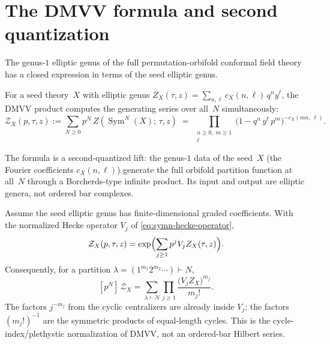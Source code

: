 
\section{The DMVV formula and second quantization}\label{sec:symn-dmvv}

The genus-$1$ elliptic genus of the full permutation-orbifold
conformal field theory has a closed expression in terms of the seed
elliptic genus.

\begin{theorem}
\label{thm:symn-dmvv-product}
For a seed theory~$X$ with elliptic genus
$Z_X(\tau, z) = \sum_{n,\ell} c_X(n,\ell)\, q^n y^\ell$,
the DMVV product computes the generating series over all~$N$
simultaneously:
\begin{equation}\label{eq:symn-dmvv}
 \mathcal Z_X(p,\tau,z)
 :=
 \sum_{N \geq 0} p^N\, Z(\operatorname{Sym}^N(X);\, \tau, z)
 \;=\; \prod_{\substack{n \geq 0,\; m \geq 1 \\ \ell}}
 \bigl(1 - q^n\, y^\ell\, p^m\bigr)^{-c_X(mn,\, \ell)}.
\end{equation}
\end{theorem}

The formula is a second-quantized lift: the genus-$1$ data of
the seed~$X$ (the Fourier coefficients $c_X(n, \ell)$) generate
the full orbifold partition function at all~$N$ through a
Borcherds-type infinite product. Its input and output are
elliptic genera, not ordered bar complexes.

\begin{proposition}\label{prop:symn-cycle-index-plethystic}
Assume the seed elliptic genus has finite-dimensional graded
coefficients. With the normalized Hecke operator $V_j$ of
\eqref{eq:symn-hecke-operator},
\[
 \mathcal Z_X(p,\tau,z)
 =
 \exp\Bigl(\sum_{j\geq1}p^jV_jZ_X(\tau,z)\Bigr).
\]
Consequently, for a partition
$\lambda=(1^{m_1}2^{m_2}\cdots)\vdash N$,
\begin{equation}\label{eq:symn-cycle-index}
 [p^N]\,\mathcal Z_X
 =
 \sum_{\lambda\vdash N}
 \prod_{j\geq1}
 \frac{\bigl(V_jZ_X\bigr)^{m_j}}{m_j!}.
\end{equation}
The factors $j^{-m_j}$ from the cyclic centralizers are already
inside $V_j$; the factors $(m_j!)^{-1}$ are the symmetric products
of equal-length cycles. This is the cycle-index/plethystic
normalization of DMVV, not an ordered-bar Hilbert series.
\end{proposition}


